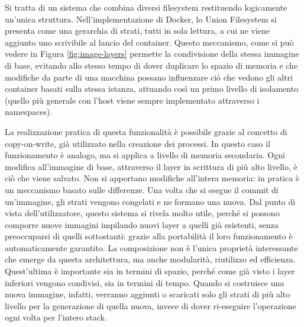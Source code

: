 Si tratta di un sistema che combina diversi filesystem restituendo logicamente un'unica struttura. Nell'implementazione di Docker, lo Union Filesystem si presenta come una gerarchia di strati, tutti in sola lettura, a cui ne viene aggiunto uno scrivibile al lancio del container. Questo meccanismo, come si può vedere in Figura \ref{fig:image-layers} permette la condivisione della stessa immagine di base, evitando allo stesso tempo di dover duplicare lo spazio di memoria e che modifiche da parte di una macchina possano influenzare ciò che vedono gli altri container basati sulla stessa istanza, attuando così un primo livello di isolamento (quello più generale con l'host viene sempre implementato attraverso i namespaces). 

La realizzazione pratica di questa funzionalità è possibile grazie al concetto di copy-on-write, già utilizzato nella creazione dei processi. In questo caso il funzionamento è analogo, ma si applica a livello di memoria secondaria. Ogni modifica all'immagine di base, attraverso il layer in scrittura di più alto livello, è ciò che viene salvato. Non si apportano modifiche all'intera memoria: in pratica è un meccanismo basato sulle differenze. Una volta che si esegue il commit di un'immagine, gli strati vengono congelati e ne formano una nuova. Dal punto di vista dell'utilizzatore, questo sistema si rivela molto utile, perché si possono comporre nuove immagini impilando nuovi layer a quelli già esistenti, senza preoccuparsi di quelli sottostanti: grazie alla portabilità il loro funzionamento è automaticamente garantito. La composizione non è l'unica proprietà interessante che emerge da questa architettura, ma anche modularità, riutilizzo ed efficienza. Quest'ultima è importante sia in termini di spazio, perché come già visto i layer inferiori vengono condivisi, sia in termini di tempo. Quando si costruisce una nuova immagine, infatti, verranno aggiunti o scaricati solo gli strati di più alto livello per la generazione di quella nuova, invece di dover ri-eseguire l'operazione ogni volta per l'intero stack.
  	
